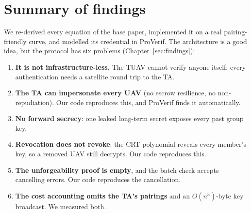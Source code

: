 \section{Summary of findings}
We re-derived every equation of the base paper, implemented it on a real pairing-friendly curve, and modelled its credential in ProVerif. The
architecture is a good idea, but the protocol has six problems (Chapter~\ref{sec:findings}):
\begin{enumerate}[label=\textbf{F\arabic*.}]
  \item \textbf{It is not infrastructure-less.} The TUAV cannot verify anyone itself; every authentication needs a satellite round trip to the TA.
  \item \textbf{The TA can impersonate every UAV} (no escrow resilience, no non-repudiation). Our code reproduces this, and ProVerif finds it automatically.
  \item \textbf{No forward secrecy}: one leaked long-term secret exposes every past group key.
  \item \textbf{Revocation does not revoke}: the CRT polynomial reveals every member's key, so a removed UAV still decrypts. Our code reproduces this.
  \item \textbf{The unforgeability proof is empty}, and the batch check accepts cancelling errors. Our code reproduces the cancellation.
  \item \textbf{The cost accounting omits the TA's pairings} and an $O(n^3)$-byte key broadcast. We measured both.
\end{enumerate}

